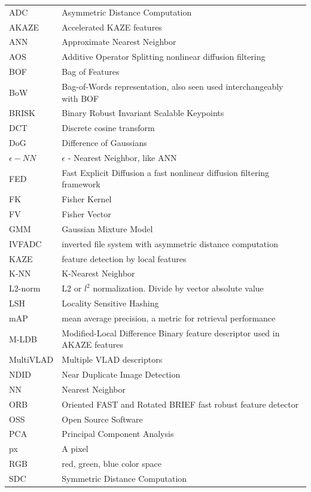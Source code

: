 \documentclass[english,12pt,a4paper,pdftex,elec,utf8]{aaltothesis}
\begin{document}
\begin{tabular}{ll}
  ADC & Asymmetric Distance Computation\\
  AKAZE & Accelerated KAZE features\\
  ANN & Approximate Nearest Neighbor\\
  AOS & Additive Operator Splitting nonlinear diffusion filtering\\
  BOF & Bag of Features\\
  BoW & Bag-of-Words representation, also seen used interchangeably with BOF\\
  BRISK & Binary Robust Invariant Scalable Keypoints\\
  DCT & Discrete cosine transform\\
  DoG & Difference of Gaussians\\
  $\epsilon -NN$ & $\epsilon$ - Nearest Neighbor, like ANN\\
  FED & Fast Explicit Diffusion a fast nonlinear diffusion filtering framework\\
  FK & Fisher Kernel\\
  FV & Fisher Vector\\
  GMM & Gaussian Mixture Model\\
  IVFADC & inverted file system with asymmetric distance computation\\
  KAZE & feature detection by local features\\
  K-NN & K-Nearest Neighbor\\
  L2-norm & L2 or $l^2$ normalization. Divide by vector absolute value\\
  LSH & Locality Sensitive Hashing\\
  mAP & mean average precision, a metric for retrieval performance\\
  M-LDB & Modified-Local Difference Binary feature descriptor used in AKAZE features\\
  MultiVLAD & Multiple VLAD descriptors\\
  NDID & Near Duplicate Image Detection\\
  NN & Nearest Neighbor\\
  ORB & Oriented FAST and Rotated BRIEF fast robust feature detector\\
  OSS & Open Source Software\\
  PCA & Principal Component Analysis\\
  px & A pixel  \\
  RGB & red, green, blue color space\\
  SDC & Symmetric Distance Computation\\

\end{tabular}
\end{document}
